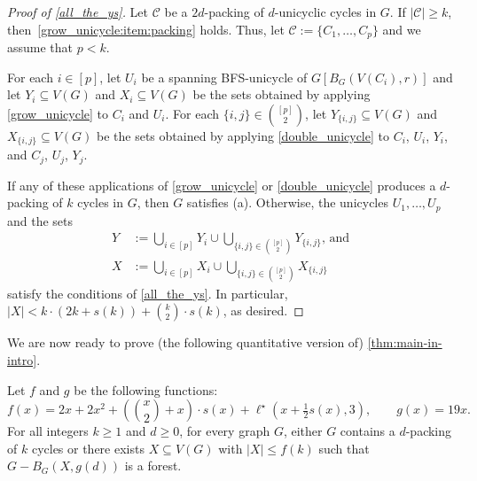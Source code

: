 \documentclass{patmorin}
\newcommand{\gwen}[1]{\textcolor{Purple}{Gwen: #1}}
\newcommand{\piotr}[1]{\textcolor{red}{Piotr: #1}}
\begin{document}
\begin{proof}[Proof of \cref{all_the_ys}]
  Let $\mathcal{C}$ be a $2d$-packing of $d$-unicyclic cycles in $G$.
  If $|\mathcal{C}|\geq k$, then~\cref{grow_unicycle:item:packing} holds.
  Thus, let $\mathcal{C}:=\{C_1,\ldots,C_p\}$ and we assume that $p<k$.

  For each $i\in[p]$, let $U_i$ be a spanning BFS-unicycle of $G[B_G(V(C_i),r)]$ and let $Y_i\subseteq V(G)$ and $X_i\subseteq V(G)$ be the sets obtained by applying \cref{grow_unicycle} to $C_i$ and $U_i$.  For each $\{i,j\}\in \binom{[p]}{2}$, let $Y_{\{i,j\}}\subseteq V(G)$ and $X_{\{i,j\}}\subseteq V(G)$ be the sets obtained by applying \cref{double_unicycle} to $C_i$, $U_i$, $Y_i$, and $C_j$, $U_j$, $Y_j$.

  If any of these applications of \cref{grow_unicycle} or \cref{double_unicycle} produces a $d$-packing of $k$ cycles in $G$, then $G$ satisfies (a).  Otherwise, the unicycles $U_1,\ldots,U_p$ and
  the sets
  \begin{align*}
  Y& :=\textstyle\bigcup_{i\in[p]} Y_i\cup \bigcup_{\{i,j\}\in\binom{[p]}{2}} Y_{\{i,j\}}\text{, and} \\ X& :=\textstyle\bigcup_{i\in[p]} X_i\cup \bigcup_{\{i,j\}\in\binom{[p]}{2}} X_{\{i,j\}}
  \end{align*}
  satisfy the conditions of \cref{all_the_ys}.
  In particular, $|X| < k\cdot(2k+s(k))+\binom{k}{2}\cdot s(k)$, as desired.
\end{proof}

We are now ready to prove (the following quantitative version of) \cref{thm:main-in-intro}.

\begin{thm}\label{thm:the-big-ball-of-wax}
  Let $f$ and $g$ be the following functions:
  \[
    \textstyle f(x)=
  2x+2x^2 + (\binom{x}{2}+x)\cdot s(x) + \ell^\star(x+\tfrac{1}{2}s(x),3), \qquad
    g(x)= 19x.
  \]
  For all integers $k\ge 1$ and $d\ge 0$, for every graph $G$, either $G$ contains a $d$-packing of $k$ cycles or there exists $X\subseteq V(G)$ with $|X|\leq f(k)$ such that $G-B_G(X,g(d))$ is a forest.
\end{thm}
\end{document}
